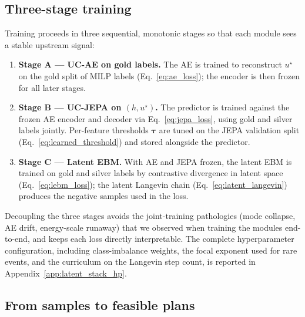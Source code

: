 \documentclass{article}
\begin{document}
\subsection{Three-stage training}
\label{sec:ebm_training}

Training proceeds in three sequential, monotonic stages so that each module sees a stable upstream signal:
\begin{enumerate}[noitemsep]
  \item \textbf{Stage A --- UC-AE on gold labels.} The AE is trained to reconstruct $u^\star$ on the gold split of MILP labels (Eq.~\ref{eq:ae_loss}); the encoder is then frozen for all later stages.
  \item \textbf{Stage B --- UC-JEPA on $(h, u^\star)$.} The predictor is trained against the frozen AE encoder and decoder via Eq.~\ref{eq:jepa_loss}, using gold and silver labels jointly. Per-feature thresholds $\boldsymbol\tau$ are tuned on the JEPA validation split (Eq.~\ref{eq:learned_threshold}) and stored alongside the predictor.
  \item \textbf{Stage C --- Latent EBM.} With AE and JEPA frozen, the latent EBM is trained on gold and silver labels by contrastive divergence in latent space (Eq.~\ref{eq:lebm_loss}); the latent Langevin chain (Eq.~\ref{eq:latent_langevin}) produces the negative samples used in the loss.
\end{enumerate}
Decoupling the three stages avoids the joint-training pathologies (mode collapse, AE drift, energy-scale runaway) that we observed when training the modules end-to-end, and keeps each loss directly interpretable. The complete hyperparameter configuration, including class-imbalance weights, the focal exponent used for rare events, and the curriculum on the Langevin step count, is reported in Appendix~\ref{app:latent_stack_hp}.

\subsection{From samples to feasible plans}
\label{sec:ebm_inference}
\end{document}
